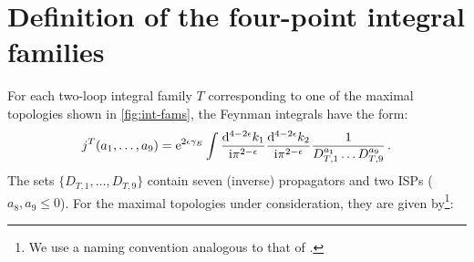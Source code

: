 \documentclass[main.tex]{subfiles}
\begin{document}
\chapter{Definition of the four-point integral families} \label{app:int_def}
For each two-loop integral family $T$ corresponding to one of the maximal topologies shown in \cref{fig:int-fams}, the Feynman integrals have the form:
\begin{equation}
	j^{T}(a_1, \ldots, a_9) = \mathrm{e}^{2 \epsilon \gamma_{E}} \int \frac{\mathrm{d}^{4-2\epsilon} k_1}{\mathrm{i} \pi^{2-\epsilon}} \frac{\mathrm{d}^{4-2\epsilon} k_2}{\mathrm{i} \pi^{2-\epsilon}} \frac{1}{D_{T,1}^{a_1} \ldots D_{T,9}^{a_9}} \,.
\end{equation}
The sets $\{D_{T,1}, \ldots, D_{T,9}\}$ contain seven (inverse) propagators and two ISPs ($a_8, a_9 \le 0$). 
For the maximal topologies under consideration, they are given by\footnote{We use a naming convention analogous to that of .}:
\end{document}
